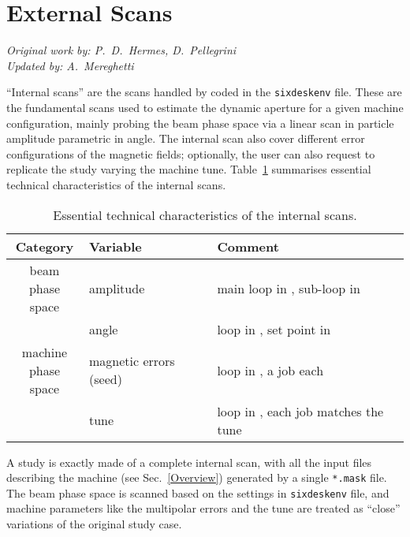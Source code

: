 \section{External Scans} \label{ExternalScans}
\begin{flushright}
\emph{Original work by: P.~D.~Hermes, D.~Pellegrini} \\
\emph{Updated by: A.~Mereghetti}
\end{flushright}
``Internal scans'' are the scans handled by \SIXDESK{} coded
in the \texttt{sixdeskenv} file. These are the fundamental
scans used to estimate the dynamic aperture for a given machine configuration,
mainly probing the beam phase space via a linear scan in particle amplitude
parametric in angle. The internal scan also cover different error
configurations of the magnetic fields; optionally, the user can also request
to replicate the study varying the machine tune.
Table~\ref{tab:InternalScanParamters} summarises essential technical
characteristics of the internal scans.
\begin{table}[h]
\begin{center}
    \caption{Essential technical
      characteristics of the internal scans.}
    \label{tab:InternalScanParamters}
    \begin{tabular}{|c|l|l|}
    \hline
    \rowcolor{blue!30}
    \textbf{Category} & \textbf{Variable} & \textbf{Comment} \\
    \hline
    \multirowcell{2}{beam \\ phase space}
    & amplitude & main loop in \SIXDESK{}, sub-loop in \SIXTRACK{} \\
    \cline{2-3}
    & angle     & loop in \SIXDESK{}, set point in \SIXTRACK{} \\
    \hline
    \multirowcell{2}{machine \\ phase space}
    & magnetic errors (seed) & loop in \SIXDESK{}, a \MADX{} job each\\
    \cline{2-3}
    & tune & loop in \SIXDESK{}, each \SIXTRACK{} job matches the tune \\
    \hline
    \end{tabular}
\end{center}
\end{table}

A \SIXDESK{} study is exactly made of a complete internal scan, with all the
\SIXTRACK{} input files describing the machine (see Sec.~\ref{Overview})
generated by a single \texttt{*.mask} file. The beam phase space is scanned
based on the settings in \texttt{sixdeskenv} file, and machine parameters like
the multipolar errors and the tune are treated as ``close'' variations of the
original study case.


